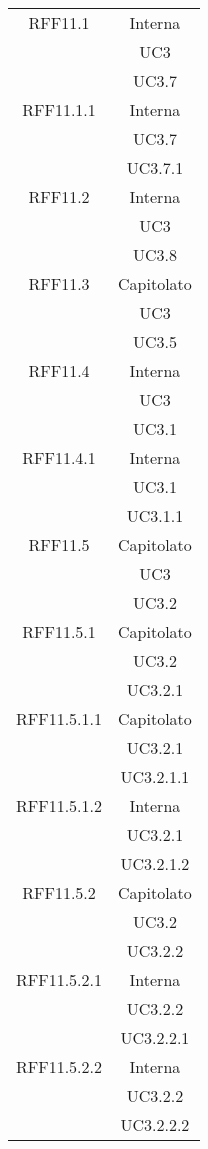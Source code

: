 \begin{longtable}{|c|c|}
\midrule
RFF11.1
& Interna\\
& UC3\\
& UC3.7\\

\midrule
RFF11.1.1
& Interna\\
& UC3.7\\
& UC3.7.1\\

\midrule
RFF11.2
& Interna\\
& UC3\\
& UC3.8\\

\midrule
RFF11.3
& Capitolato\\
& UC3\\
& UC3.5\\

\midrule
RFF11.4
& Interna\\
& UC3\\
& UC3.1\\

\midrule
RFF11.4.1
& Interna\\
& UC3.1\\
& UC3.1.1\\

\midrule
RFF11.5
& Capitolato\\
& UC3\\
& UC3.2\\

\midrule
RFF11.5.1
& Capitolato\\
& UC3.2\\
& UC3.2.1\\

\midrule
RFF11.5.1.1
& Capitolato\\
& UC3.2.1\\
& UC3.2.1.1\\

\midrule
RFF11.5.1.2
& Interna\\
& UC3.2.1\\
& UC3.2.1.2\\

\midrule
RFF11.5.2
& Capitolato\\
& UC3.2\\
& UC3.2.2\\

\midrule
RFF11.5.2.1
& Interna\\
& UC3.2.2\\
& UC3.2.2.1\\

\midrule
RFF11.5.2.2
& Interna\\
& UC3.2.2\\
& UC3.2.2.2\\


\end{longtable}
